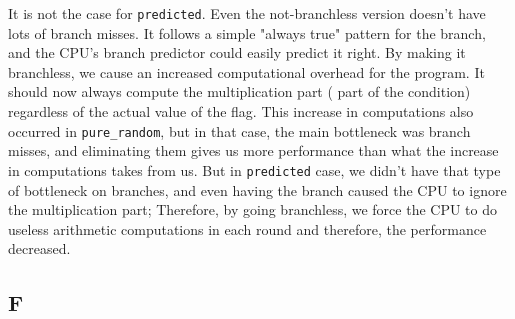 \documentclass[12pt]{article}
\begin{document}
\begin{itemize}
It is not the case for \Verb+predicted+. Even the not-branchless version doesn't have lots of branch misses. It follows a simple "always true" pattern for the branch, and the CPU's branch predictor could easily predict it right. By making it branchless, we cause an increased computational overhead for the program. It should now always compute the multiplication part ( part of the condition) regardless of the actual value of the flag. This increase in computations also occurred in \Verb+pure_random+, but in that case, the main bottleneck was branch misses, and eliminating them gives us more performance than what the increase in computations takes from us. But in \Verb+predicted+ case, we didn't have that type of bottleneck on branches, and even having the branch caused the CPU to ignore the multiplication part; Therefore, by going branchless, we force the CPU to do useless arithmetic computations in each round and therefore, the performance decreased.
	
		\end{itemize}
	
	\subsection{F}
	
\end{document}
